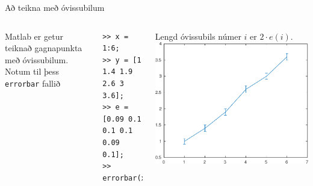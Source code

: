 \documentclass{beamer}
\begin{document}
\begin{frame}[fragile]{Að teikna með óvissubilum}
\begin{columns}
Matlab er getur teiknað gagnapunkta með óvissubilum. Notum til þess \texttt{errorbar} fallið
\begin{verbatim}
>> x = 1:6;
>> y = [1 1.4 1.9 2.6 3 3.6];
>> e = [0.09 0.1 0.1 0.1 0.09 0.1];
>> errorbar(x,y,e)
\end{verbatim}
Lengd óvissubils númer $i$ er $2\cdot e(i)$.
\includegraphics[width=\textwidth]{Pics/simple-errorbar}
\end{columns}
\end{frame}
\end{document}
